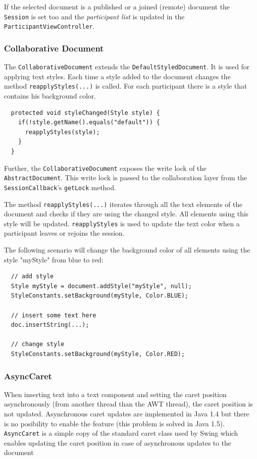 If the selected document is a published or a joined (remote) document the \texttt{Session} is set too and the \emph{participant list} is updated in the \texttt{Participant\-View\-Controller}.

\subsubsection{Collaborative Document}
\label{applicationlayer_collabdocument}

The \texttt{Collaborative\-Document} extends the \texttt{Default\-Styled\-Document}. It is used for applying text styles. Each time a style added to the document changes the method \texttt{reapplyStyles(...)} is called. For each
participant there is a style that contains his background color.

\begin{verbatim}
  protected void styleChanged(Style style) {
    if(!style.getName().equals("default")) {
      reapplyStyles(style);
    }
  }
\end{verbatim}

Further, the \texttt{Collaborative\-Document} exposes the write lock of
the \texttt{Abstract\-Document}. This write lock is passed to the
collaboration layer from the \texttt{Session\-Callback}'s \texttt{get\-Lock}
method.

The method \texttt{reapplyStyles(...)} iterates through all the text elements of the document and checks if they are using the changed style. All elements using this style will be updated. \texttt{reapplyStyles} is used to update the text color when a participant leaves or rejoins the session. 

The following scenario will change the background color of all elements using the style "myStyle" from blue to red:
\begin{verbatim}
  // add style
  Style myStyle = document.addStyle("myStyle", null);
  StyleConstants.setBackground(myStyle, Color.BLUE);
  
  // insert some text here
  doc.insertString(...);
  
  // change style
  StyleConstants.setBackground(myStyle, Color.RED);
\end{verbatim}


\subsubsection{AsyncCaret}
When inserting text into a text component and setting the caret position asynchronously (from another thread than the AWT thread), the caret position is not updated. Asynchronous caret updates are implemented in Java 1.4 but there is no posibility to enable the feature (this problem is solved in Java 1.5). \texttt{Async\-Caret} is a simple copy of the standard caret class used by Swing which enables updating the caret position in case of asynchronous updates to the document

